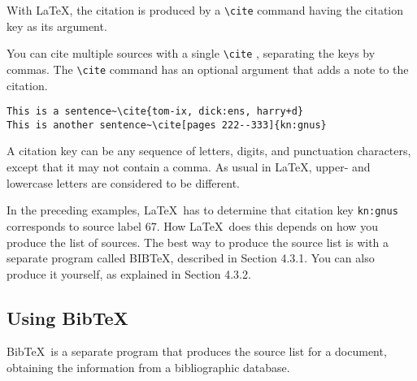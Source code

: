 \documentclass{article}
\begin{document}
With \LaTeX, the citation is produced by a \verb:\cite: command having the citation key as its
argument.

You can cite multiple sources with a single \verb:\cite: , separating the keys by commas. 
The \verb:\cite: command has an optional argument that adds a note to the citation.

\begin{lstlisting}[language={[LaTeX]TeX}]
This is a sentence~\cite{tom-ix, dick:ens, harry+d}
This is another sentence~\cite[pages 222--333]{kn:gnus}
\end{lstlisting}

A citation key can be any sequence of letters, digits, and punctuation characters, except that it
may not contain a comma. As usual in \LaTeX, upper- and lowercase letters are considered to be
different.

In the preceding examples, \LaTeX\ has to determine that citation key \verb-kn:gnus- corresponds to
source label 67. How \LaTeX\ does this depends on how you produce the list of sources. The best way
to produce the source list is with a separate program called BIB\TeX, described in Section 4.3.1.
You can also produce it yourself, as explained in Section 4.3.2.

\subsection{Using Bib\TeX}

Bib\TeX\ is a separate program that produces the source list for a document, obtaining the
information from a bibliographic database. 
\end{document}
